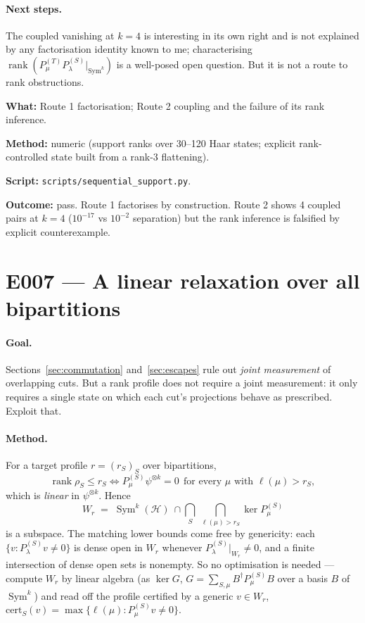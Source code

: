 \documentclass[11pt]{article}
\theoremstyle{definition}
\theoremstyle{remark}
\newcommand{\Sym}{\operatorname{Sym}}
\newcommand{\rank}{\operatorname{rank}}
\newcommand{\Hil}{\mathcal{H}}
\begin{document}
\paragraph{Next steps.}
The coupled vanishing at $k=4$ is interesting in its own right and is not explained by
any factorisation identity known to me; characterising
$\rank(P^{(T)}_\mu P^{(S)}_\lambda|_{\Sym^k})$ is a well-posed open question. But it is
not a route to rank obstructions.

\begin{verification}
\textbf{What:} Route 1 factorisation; Route 2 coupling and the failure of its rank
inference.

\textbf{Method:} numeric (support ranks over 30--120 Haar states; explicit
rank-controlled state built from a rank-3 flattening).

\textbf{Script:} \texttt{scripts/sequential\_support.py}.

\textbf{Outcome:} pass. Route 1 factorises by construction. Route 2 shows 4 coupled
pairs at $k=4$ ($10^{-17}$ vs $10^{-2}$ separation) but the rank inference is
falsified by explicit counterexample.
\end{verification}

\section{E007 --- A linear relaxation over all bipartitions}
\label{sec:relaxation}

\paragraph{Goal.}
Sections~\ref{sec:commutation} and~\ref{sec:escapes} rule out \emph{joint measurement}
of overlapping cuts. But a rank profile does not require a joint measurement: it only
requires a single state on which each cut's projections behave as prescribed. Exploit
that.

\paragraph{Method.}
For a target profile $r = (r_S)_S$ over bipartitions,
\[
  \rank\rho_S \le r_S \iff P^{(S)}_\mu \psi^{\otimes k} = 0
     \ \ \text{for every } \mu \text{ with } \ell(\mu) > r_S ,
\]
which is \emph{linear} in $\psi^{\otimes k}$. Hence
\[
  W_r \;=\; \Sym^k(\Hil) \ \cap \bigcap_{S}\ \bigcap_{\ell(\mu) > r_S} \ker P^{(S)}_\mu
\]
is a subspace. The matching lower bounds come free by genericity: each
$\{v : P^{(S)}_\lambda v \ne 0\}$ is dense open in $W_r$ whenever
$P^{(S)}_\lambda|_{W_r} \ne 0$, and a finite intersection of dense open sets is
nonempty. So no optimisation is needed --- compute $W_r$ by linear algebra (as
$\ker G$, $G = \sum_{S,\mu} B^\dagger P^{(S)}_\mu B$ over a basis $B$ of $\Sym^k$) and
read off the profile certified by a generic $v \in W_r$,
$\mathrm{cert}_S(v) = \max\{\ell(\mu) : P^{(S)}_\mu v \ne 0\}$.
\end{document}

